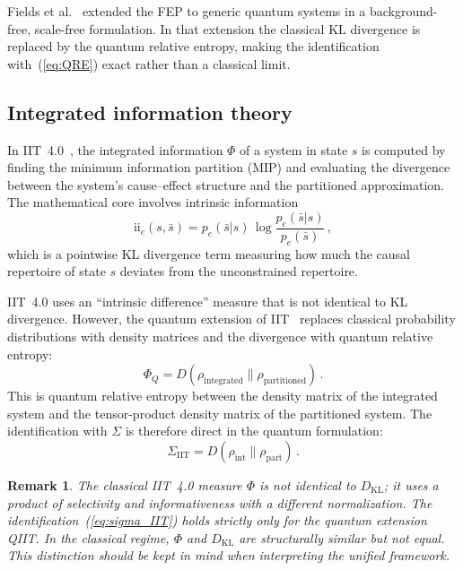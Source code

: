 \documentclass[prl,twocolumn,superscriptaddress,longbibliography,floatfix]{revtex4-2}
\newtheorem{remark}{Remark}
\newcommand{\DKL}{D_{\mathrm{KL}}}
\begin{document}
Fields et al.~\cite{Fields2022} extended the FEP to generic quantum
systems in a background-free, scale-free formulation.  In that
extension the classical KL divergence is replaced by the quantum
relative entropy, making the identification
with~(\ref{eq:QRE}) exact rather than a classical limit.

\subsection{Integrated information theory}
\label{subsec:IIT}

In IIT~4.0~\cite{Albantakis2023}, the integrated information $\Phi$
of a system in state $s$ is computed by finding the minimum
information partition (MIP) and evaluating the divergence between
the system's cause--effect structure and the partitioned
approximation.  The mathematical core involves intrinsic information
\begin{equation}
\mathrm{ii}_e(s,\bar{s}) = p_e(\bar{s}|s)\,\log\frac{p_e(\bar{s}|s)}
{p_e(\bar{s})}\,,
\end{equation}
which is a pointwise KL divergence term measuring how much the causal
repertoire of state $s$ deviates from the unconstrained repertoire.

IIT~4.0 uses an ``intrinsic difference'' measure that is not
identical to KL divergence.  However, the quantum extension of
IIT~\cite{Zanardi2018,Albantakis2023Q} replaces classical probability
distributions with density matrices and the divergence with quantum
relative entropy:
\begin{equation}
\Phi_Q = D(\rho_{\mathrm{integrated}}\|\rho_{\mathrm{partitioned}})\,.
\label{eq:Phi_Q}
\end{equation}
This is quantum relative entropy between the density matrix of the
integrated system and the tensor-product density matrix of the
partitioned system.  The identification with $\Sigma$ is therefore
direct in the quantum formulation:
\begin{equation}
\Sigma_{\mathrm{IIT}} = D(\rho_{\mathrm{int}}\|\rho_{\mathrm{part}})\,.
\label{eq:sigma_IIT}
\end{equation}

\begin{remark}
The classical IIT~4.0 measure $\Phi$ is \emph{not} identical to
$\DKL$; it uses a product of selectivity and informativeness with a
different normalization.  The identification~(\ref{eq:sigma_IIT})
holds strictly only for the quantum extension QIIT.  In the
classical regime, $\Phi$ and $\DKL$ are structurally similar but
not equal.  This distinction should be kept in mind when
interpreting the unified framework.
\end{remark}
\end{document}
